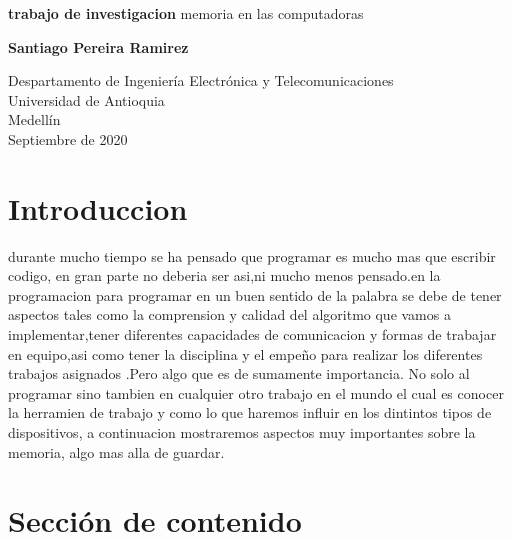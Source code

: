 \documentclass{article}
\begin{document}
\begin{titlepage}
    \begin{center}
        \vspace*{1cm}
            
        \Huge
        \textbf{trabajo de investigacion}
        \vspace{0.5cm}
        \LARGE
        memoria en las computadoras
            
        \vspace{1.5cm}
            
        \textbf{Santiago Pereira Ramirez}
            
        \vfill
            
        \vspace{0.8cm}
            
        \Large
        Despartamento de Ingeniería Electrónica y Telecomunicaciones\\
        Universidad de Antioquia\\
        Medellín\\
        Septiembre de 2020
            
    \end{center}
\end{titlepage}

\tableofcontents

\section{Introduccion}
durante mucho tiempo se ha pensado que programar es mucho mas que  escribir codigo, en gran parte no deberia ser asi,ni mucho menos pensado.en la programacion para programar en un buen sentido de la palabra se debe de tener aspectos tales como la comprension y calidad del algoritmo que vamos a implementar,tener diferentes capacidades de comunicacion 
y formas de trabajar en equipo,asi como tener la disciplina y el empeño para realizar los diferentes trabajos asignados .Pero algo que es de sumamente importancia.
No solo al programar sino tambien en cualquier otro trabajo en el mundo el cual es conocer la herramien de trabajo y como lo que haremos influir en los dintintos 
tipos de dispositivos, a continuacion mostraremos aspectos muy importantes sobre la memoria, algo mas alla de guardar.

\section{Sección de contenido} \label{contenido}
\end{document}
